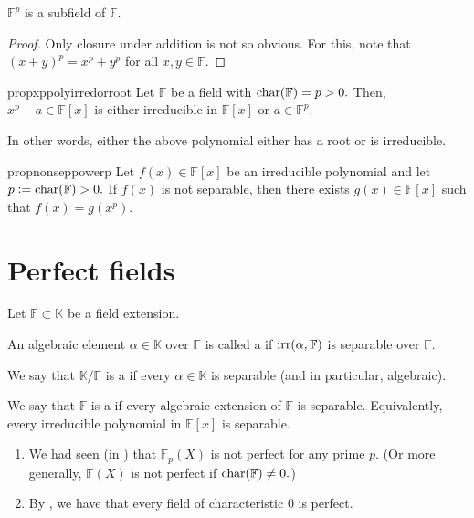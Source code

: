 \begin{prop}
    $\mathbb{F}^p$ is a subfield of $\mathbb{F}.$
\end{prop}
\begin{proof} 
    Only closure under addition is not so obvious. For this, note that $(x + y)^p = x^p + y^p$ for all $x, y \in \mathbb{F}.$
\end{proof}

\begin{restatable}[]{prop}{xppolyirredorroot}
\label{prop:xppolyirredorroot}
    Let $\mathbb{F}$ be a field with $\operatorname{char}(\mathbb{F}) = p > 0.$ Then, $x^p - a \in \mathbb{F}[x]$ is either irreducible in $\mathbb{F}[x]$ or $a \in \mathbb{F}^p.$ \hfill\hyperref[prop:xppolyirredorroot2]{\downsym}
\end{restatable}

In other words, either the above polynomial either has a root or is irreducible.

\begin{restatable}[]{prop}{nonseppowerp}
\label{prop:nonseppowerp}
    Let $f(x) \in \mathbb{F}[x]$ be an irreducible polynomial and let $p \vcentcolon= \operatorname{char}(\mathbb{F}) > 0.$ If $f(x)$ is not separable, then there exists $g(x) \in \mathbb{F}[x]$ such that $f(x) = g(x^p).$ \hfill\hyperref[prop:nonseppowerp2]{\downsym}
\end{restatable}

\section{Perfect fields}
\begin{defn}%
    Let $\mathbb{F} \subset \mathbb{K}$ be a field extension. 

    An algebraic element $\alpha \in \mathbb{K}$ over $\mathbb{F}$ is called a  if $\operatorname{irr}(\alpha, \mathbb{F})$ is separable over $\mathbb{F}.$

    We say that $\mathbb{K}/\mathbb{F}$ is a  if every $\alpha \in \mathbb{K}$ is separable (and in particular, algebraic). 

    We say that $\mathbb{F}$ is a  if every algebraic extension of $\mathbb{F}$ is separable. Equivalently, every irreducible polynomial in $\mathbb{F}[x]$ is separable.
\end{defn}

\begin{ex}
    \phantom{hi}
    \begin{enumerate}
        \item We had seen (in ) that $\mathbb{F}_p(X)$ is not perfect for any prime $p.$ (Or more generally, $\mathbb{F}(X)$ is not perfect if $\operatorname{char}(\mathbb{F}) \neq 0.$) 
        \item By , we have that every field of characteristic $0$ is perfect.
    \end{enumerate}
\end{ex}

